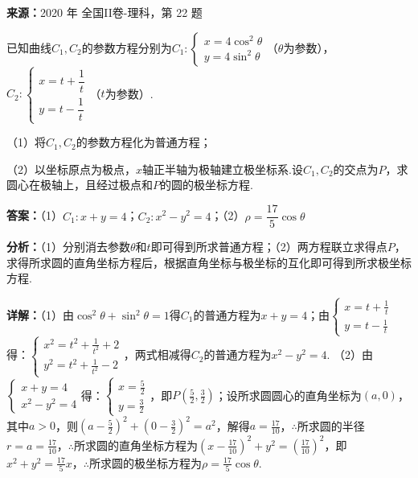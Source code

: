 \begin{question}[points=10]
\textbf{来源：}2020 年 全国II卷-理科，第 22 题\par
已知曲线$C_1,C_2$的参数方程分别为$C_1:\begin{cases}x=4\cos^2\theta\\y=4\sin^2\theta\end{cases}$（$\theta$为参数），$C_2:\begin{cases}x=t+\dfrac1t\\y=t-\dfrac1t\end{cases}$（$t$为参数）.

（1）将$C_1,C_2$的参数方程化为普通方程；

（2）以坐标原点为极点，$x$轴正半轴为极轴建立极坐标系.设$C_1,C_2$的交点为$P$，求圆心在极轴上，且经过极点和$P$的圆的极坐标方程.
\begin{solution}
\textbf{答案：}（1）$C_1:x+y=4$；$C_2:x^2-y^2=4$；（2）$\rho=\dfrac{17}{5}\cos\theta$

\textbf{分析：}（1）分别消去参数$\theta$和$t$即可得到所求普通方程；（2）两方程联立求得点$P$，求得所求圆的直角坐标方程后，根据直角坐标与极坐标的互化即可得到所求极坐标方程.

\textbf{详解：}（1）由$\cos^2\theta+\sin^2\theta=1$得$C_1$的普通方程为$x+y=4$；由$\begin{cases}x=t+\frac1t\\y=t-\frac1t\end{cases}$得：$\begin{cases}x^2=t^2+\frac1{t^2}+2\\y^2=t^2+\frac1{t^2}-2\end{cases}$，两式相减得$C_2$的普通方程为$x^2-y^2=4$.
（2）由$\begin{cases}x+y=4\\x^2-y^2=4\end{cases}$得：$\begin{cases}x=\frac52\\y=\frac32\end{cases}$，即$P(\frac52,\frac32)$；设所求圆圆心的直角坐标为$(a,0)$，其中$a>0$，则$(a-\frac52)^2+(0-\frac32)^2=a^2$，解得$a=\frac{17}{10}$，$\therefore$所求圆的半径$r=a=\frac{17}{10}$，$\therefore$所求圆的直角坐标方程为$(x-\frac{17}{10})^2+y^2=(\frac{17}{10})^2$，即$x^2+y^2=\frac{17}{5}x$，$\therefore$所求圆的极坐标方程为$\rho=\frac{17}{5}\cos\theta$.
\end{solution}
\end{question}

